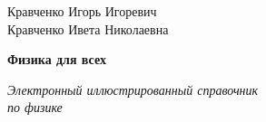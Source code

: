 \begin{titlepage}
    \begin{center}
        \vspace*{0.5cm}
        
        \Large
        Кравченко Игорь Игоревич\\
        Кравченко Ивета Николаевна
        
        \vspace{1cm}
        \Huge
        \textbf{Физика для всех}
        
        
        \vfill
        \Large
        \textit{Электронный иллюстрированный справочник\\
        по физике}
        
        \vspace{17cm}

    \end{center}
\end{titlepage}
